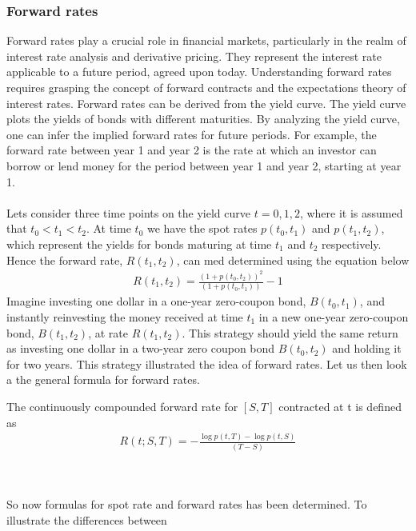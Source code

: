 \subsubsection{Forward rates}
Forward rates play a crucial role in financial markets, particularly in the realm of interest rate analysis and 
derivative pricing. They represent the interest rate applicable to a future period, agreed upon today.
Understanding forward rates requires grasping the concept of forward contracts and the expectations theory of interest rates.
Forward rates can be derived from the yield curve. The yield curve plots the yields of bonds with different maturities.
By analyzing the yield curve, one can infer the implied forward rates for future periods. For example, 
the forward rate between year 1 and year 2 is the rate at which an investor can borrow or lend money for the period
between year 1 and year 2, starting at year 1.
\\\\
Lets consider three time points on the yield curve $t=0,1,2$, where it is assumed
that $t_0 < t_1 < t_2$. At time $t_0$ we have the spot rates $p(t_0,t_1)$ and $p(t_1,t_2)$,
which represent the yields for bonds maturing at time $t_1$ and $t_2$ respectively.
Hence the forward rate, $R(t_1,t_2)$, can med determined using the equation below \cite{Bjork}
\begin{align*}
    R(t_1,t_2)= \frac{(1+p(t_0,t_2))^2}{(1+p(t_0,t_1))}-1
\end{align*}
Imagine investing one dollar in a one-year zero-coupon bond, $B(t_0,t_1)$,
and instantly reinvesting the money received at time $t_1$ in a new one-year zero-coupon bond,
$B(t_1,t_2)$, at rate $R(t_1,t_2)$. This strategy should yield the same return as investing 
one dollar in a two-year zero coupon bond $B(t_0,t_2)$ and holding it for two years. 
This strategy illustrated the idea of forward rates. Let us then look a the general
formula for forward rates. 
\begin{definition}\label{def:forward}
    The continuously compounded forward rate for $[S,T]$ contracted at t is defined
    as \cite{Bjork} 
    \begin{align*}
        R(t;S,T)= - \frac{\log p(t,T)- \log p(t,S)}{(T-S)} 
    \end{align*}
\end{definition} 
\noindent
\\\\
So now formulas for spot rate and forward rates has been determined. To illustrate the differences between 
